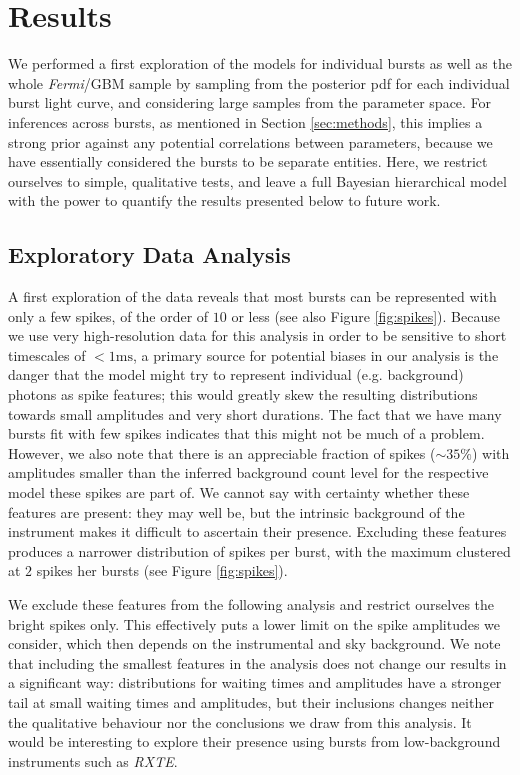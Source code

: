 \documentclass[12pt]{emulateapj}
\newcommand{\project}[1]{\textsl{#1}}
\newcommand{\rxte}{\project{RXTE}}
\begin{document}
\section{Results}

We performed a first exploration of the models for individual bursts as well as the whole {\it Fermi}/GBM
sample by sampling from the posterior pdf for each individual burst light curve, and considering large
samples from the parameter space. For inferences across bursts, as mentioned in Section \ref{sec:methods},
this implies a strong prior against any potential correlations between parameters, because we have essentially
considered the bursts to be separate entities. Here, we restrict ourselves to simple, qualitative tests, and
leave a full Bayesian hierarchical model with the power to quantify the results presented below to future work. 


\subsection{Exploratory Data Analysis}

A first exploration of the data reveals that most bursts can be represented with only a few spikes, of the order of 
$10$ or less (see also Figure \ref{fig:spikes}). Because we use very high-resolution data for this analysis in order to
be sensitive to short timescales of $< 1\mathrm{ms}$, a primary source for potential biases in our analysis is the
danger that the model might try to represent individual (e.g. background) photons as spike features; this would greatly
skew the resulting distributions towards small amplitudes and very short durations. The fact that we have many bursts
fit with few spikes indicates that this might not be much of a problem. However, we also note that there is an appreciable fraction
of spikes ($\sim 35\%$) with amplitudes smaller than the inferred background count level for the respective model these spikes 
are part of. We cannot say with certainty whether these features are present: they may well be, but the intrinsic background
of the instrument makes it difficult to ascertain their presence. Excluding these features produces a narrower distribution
of spikes per burst, with the maximum clustered at $2$ spikes her bursts (see Figure \ref{fig:spikes}).

We exclude these features from the following analysis and restrict ourselves the bright spikes only. This effectively puts a
lower limit on the spike amplitudes we consider, which then depends on the instrumental and sky background. We note
that including the smallest features in the analysis does not change our results in a significant way: distributions for 
waiting times and amplitudes have a stronger tail at small waiting times and amplitudes, but their inclusions changes neither
the qualitative behaviour nor the conclusions we draw from this analysis. It would be interesting to explore their presence
using bursts from low-background instruments such as \rxte.
\end{document}
